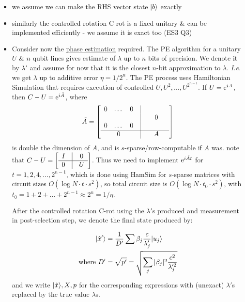 \documentclass[]{article}
\renewcommand{\it}[1]{\textit{#1}}
\begin{document}
\begin{remark*}

	\begin{itemize}
		\item we assume we can make the RHS vector state $\lvert b\rangle$ exactly
		\item similarly the controlled rotation C-rot is a fixed unitary \& can be implemented efficiently - we assume it is exact too (ES3 Q3)
		\item Consider now the \underline{phase estimation} required. The PE algorithm for a unitary $U$ \& $n$ qubit lines gives estimate of $\lambda$ up to $n$ bits of precision. We denote it by $\lambda'$ and assume for now that it is the closest $n$-bit approximation to $\lambda$. \it{I.e.} we get $\lambda$ up to additive error $\eta  = 1/2^n$. The PE process uses Hamiltonian Simulation that requires execution of controlled $U,U^2,\dots,U^{2^{n-1}}$. If $U = \mathrm{e}^{iA}$, then $C-U = \mathrm{e}^{i\tilde{A}}$, where
		\begin{align*}
			\tilde{A} = \left[\begin{array}{ccccccc}
				0 & \dots & 0 & \vline & & & \\
				&&&\vline & &0 &\\
				0 & \dots & 0 & \vline & &&\\
				\hline & 0 & &\vline & & A & \end{array}\right]
		\end{align*}
		is double the dimension of $A$, and is $s$-sparse/row-computable if $A$ was. note that $C-U = \left[\begin{array}{ccc} I & \vline & 0 \\ \hline 0 &\vline & U\end{array}\right]$. Thus we need to implement $\mathrm{e}^{i\tilde{A}t}$ for $t = 1,2,4,\dots,2^{n-1}$, which is done using HamSim for $s$-sparse matrices with circuit sizes $O(\log N \cdot t \cdot s^2)$, so total circuit size is $O(\log N \cdot t_0 \cdot s^2)$, with $t_0 = 1 + 2 + \dots + 2^{n-1} \approx 2^n = 1/\eta$.

		After the controlled rotation C-rot using the $\lambda'$s produced and measurement in post-selection step, we denote the final state produced by:

		\begin{align*}
			\lvert\hat{x}'\rangle &= \frac{1}{D'} \sum \beta_j\frac{c}{\lambda_j'}\lvert u_j\rangle\\
			\textrm{where }D' &= \sqrt{p'} = \sqrt{\sum_{j}|\beta_j|^2 \frac{c^2}{\lambda_j'^2}}
		\end{align*}
		and we write $\lvert\hat{x}\rangle,X,p$ for the corresponding expressions with (unexact) $\lambda'$s replaced by the true value $\lambda$s.


\end{itemize}
\end{remark*}
\end{document}
